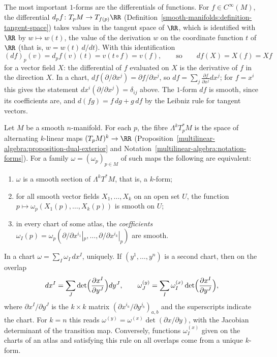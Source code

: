 \begin{remark}\label{differential-forms:remark-differential-function}
The most important $1$-forms are the differentials of functions. For $f \in C^\infty(M)$, the differential $d_pf \colon T_pM \to T_{f(p)}\RR$ (Definition~\ref{smooth-manifolds:definition-tangent-space})
takes values in the tangent space of $\RR$, which is identified with $\RR$ by $w \mapsto w(t)$, the value of the derivation $w$ on the coordinate function $t$ of $\RR$ (that is, $w = w(t)\,d/dt$).
With this identification
\[
(df)_p(v) = d_pf(v)(t) = v(t \circ f) = v(f), \qquad\text{so}\qquad df(X) = X(f) = Xf
\]
for a vector field $X$: the differential of $f$ evaluated on $X$ is the derivative of $f$ in the direction $X$. In a chart, $df(\partial/\partial x^j) = \partial f/\partial x^j$, so
$df = \sum_j\frac{\partial f}{\partial x^j}dx^j$; for $f = x^i$ this gives the statement $dx^i(\partial/\partial x^j) = \delta_{ij}$ above. The $1$-form $df$ is smooth, since its coefficients are, and
$d(fg) = f\,dg + g\,df$ by the Leibniz rule for tangent vectors.
\end{remark}

\begin{proposition}\label{differential-forms:proposition-forms-descriptions}
Let $M$ be a smooth $n$-manifold. For each $p$, the fibre $\Lambda^kT_p^*M$ is the space of alternating $k$-linear maps $(T_pM)^k \to \RR$
(Proposition~\ref{multilinear-algebra:proposition-dual-exterior} and Notation~\ref{multilinear-algebra:notation-forms}). For a family $\omega = (\omega_p)_{p \in M}$ of such maps the
following are equivalent:
\begin{enumerate}
\item $\omega$ is a smooth section of $\Lambda^kT^*M$, that is, a $k$-form;
\item for all smooth vector fields $X_1, \ldots, X_k$ on an open set $U$, the function $p \mapsto \omega_p(X_1(p), \ldots, X_k(p))$ is smooth on $U$;
\item in every chart of some atlas, the \emph{coefficients} $\omega_I(p) = \omega_p(\partial/\partial x^{i_1}|_p, \ldots, \partial/\partial x^{i_k}|_p)$ are smooth.
\end{enumerate}
In a chart $\omega = \sum_I\omega_I\,dx^I$, uniquely. If $(y^1, \ldots, y^n)$ is a second chart, then on the overlap
\[
dx^I = \sum_J\det\Bigl(\frac{\partial x^I}{\partial y^J}\Bigr)dy^J, \qquad \omega^{(y)}_J = \sum_I\omega^{(x)}_I\det\Bigl(\frac{\partial x^I}{\partial y^J}\Bigr),
\]
where $\partial x^I/\partial y^J$ is the $k \times k$ matrix $(\partial x^{i_a}/\partial y^{j_b})_{a,b}$ and the superscripts indicate the chart. For $k = n$ this reads
$\omega^{(y)} = \omega^{(x)}\det(\partial x/\partial y)$, with the Jacobian determinant of the transition map. Conversely, functions $\omega^{(x)}_I$ given on the charts of an atlas
and satisfying this rule on all overlaps come from a unique $k$-form.
\end{proposition}

